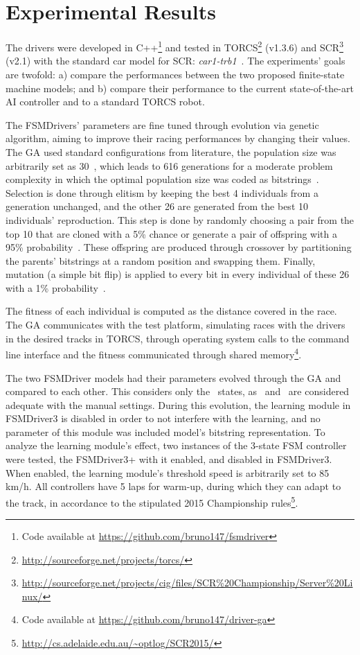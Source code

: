 \section{Experimental Results}\label{sec:4}%
\newcommand{\car}[1]{\emph{#1}}%

The drivers were developed in C++\footnote{Code available at \url{https://github.com/bruno147/fsmdriver}} and tested in TORCS\footnote{\url{http://sourceforge.net/projects/torcs/}} (v1.3.6) and SCR\footnote{\url{http://sourceforge.net/projects/cig/files/SCR\%20Championship/Server\%20Linux/}} (v2.1) with the standard car model for SCR: \car{car1-trb1}~\cite{SCR}. The experiments' goals are twofold: a) compare the performances between the two proposed finite-state machine models; and b) compare their performance to the current state-of-the-art AI controller and to a standard TORCS robot.

The FSMDrivers' parameters are fine tuned through evolution via genetic algorithm, aiming to improve their racing performances by changing their values. The GA used standard configurations from literature, the population size was arbitrarily set as 30~\cite{RATES}, which leads to 616 generations for a moderate problem complexity in which the optimal population size was coded as bitstrings~\cite{rylander2002optimal}. Selection is done through elitism by keeping the best 4 individuals from a generation unchanged, and the other 26 are generated from the best 10 individuals' reproduction. This step is done by randomly choosing a pair from the top 10 that are cloned with a 5\% chance or generate a pair of offspring with a 95\% probability~\cite{RATES}. These offspring are produced through crossover by partitioning the parents' bitstrings at a random position and swapping them. Finally, mutation (a simple bit flip) is applied to every bit in every individual of these 26 with a 1\% probability~\cite{RATES}.

The fitness of each individual is computed as the distance covered in the race. The GA communicates with the test platform, simulating races with the drivers in the desired tracks in TORCS, through operating system calls to the command line interface and the fitness communicated through shared memory\footnote{Code available at \url{https://github.com/bruno147/driver-ga}}.

The two FSMDriver models had their parameters evolved through the GA and compared to each other. This considers only the \racing~states, as \OT~and \St~are considered adequate with the manual settings. During this evolution, the learning module in FSMDriver3 is disabled in order to not interfere with the learning, and no parameter of this module was included model's bitstring representation. To analyze the learning module's effect, two instances of the 3-state FSM controller were tested, the FSMDriver3+ with it enabled, and disabled in FSMDriver3. When enabled, the learning module's threshold speed is arbitrarily set to 85 km/h. All controllers have 5 laps for warm-up, during which they can adapt to the track, in accordance to the stipulated 2015 Championship rules\footnote{\url{http://cs.adelaide.edu.au/~optlog/SCR2015/}}.

